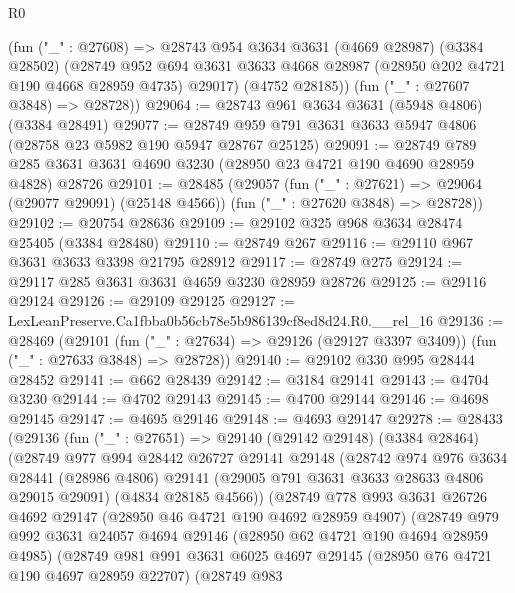 \begin{lexlean}{R0}
\begin{coremodule}
      (fun ("_" : @27608) =>
      @28743
        @954
        @3634
        @3631
        (@4669 @28987)
        (@3384 @28502)
        (@28749
          @952
          @694
          @3631
          @3633
          @4668
          @28987
          (@28950 @202 @4721 @190 @4668 @28959 @4735)
          @29017)
        (@4752 @28185))
      (fun ("_" : @27607 @3848) => @28728))
@29064 := @28743 @961 @3634 @3631 (@5948 @4806) (@3384 @28491)
@29077 := @28749 @959 @791 @3631 @3633 @5947 @4806 (@28758 @23 @5982 @190 @5947 @28767 @25125)
@29091 := @28749 @789 @285 @3631 @3631 @4690 @3230 (@28950 @23 @4721 @190 @4690 @28959 @4828) @28726
@29101 := @28485
    (@29057
      (fun ("_" : @27621) => @29064 (@29077 @29091) (@25148 @4566))
      (fun ("_" : @27620 @3848) => @28728))
@29102 := @20754 @28636
@29109 := @29102 @325 @968 @3634 @28474 @25405 (@3384 @28480)
@29110 := @28749 @267
@29116 := @29110 @967 @3631 @3633 @3398 @21795 @28912
@29117 := @28749 @275
@29124 := @29117 @285 @3631 @3631 @4659 @3230 @28959 @28726
@29125 := @29116 @29124
@29126 := @29109 @29125
@29127 := LexLeanPreserve.Ca1fbba0b56cb78e5b986139cf8ed8d24.R0.__rel_16
@29136 := @28469
    (@29101
      (fun ("_" : @27634) => @29126 (@29127 @3397 @3409))
      (fun ("_" : @27633 @3848) => @28728))
@29140 := @29102 @330 @995 @28444 @28452
@29141 := @662 @28439
@29142 := @3184 @29141
@29143 := @4704 @3230
@29144 := @4702 @29143
@29145 := @4700 @29144
@29146 := @4698 @29145
@29147 := @4695 @29146
@29148 := @4693 @29147
@29278 := @28433
    (@29136
      (fun ("_" : @27651) =>
      @29140
        (@29142 @29148)
        (@3384 @28464)
        (@28749
          @977
          @994
          @28442
          @26727
          @29141
          @29148
          (@28742
            @974
            @976
            @3634
            @28441
            (@28986 @4806)
            @29141
            (@29005 @791 @3631 @3633 @28633 @4806 @29015 @29091)
            (@4834 @28185 @4566))
          (@28749
            @778
            @993
            @3631
            @26726
            @4692
            @29147
            (@28950 @46 @4721 @190 @4692 @28959 @4907)
            (@28749
              @979
              @992
              @3631
              @24057
              @4694
              @29146
              (@28950 @62 @4721 @190 @4694 @28959 @4985)
              (@28749
                @981
                @991
                @3631
                @6025
                @4697
                @29145
                (@28950 @76 @4721 @190 @4697 @28959 @22707)
                (@28749
                  @983

\end{coremodule}
\end{lexlean}
